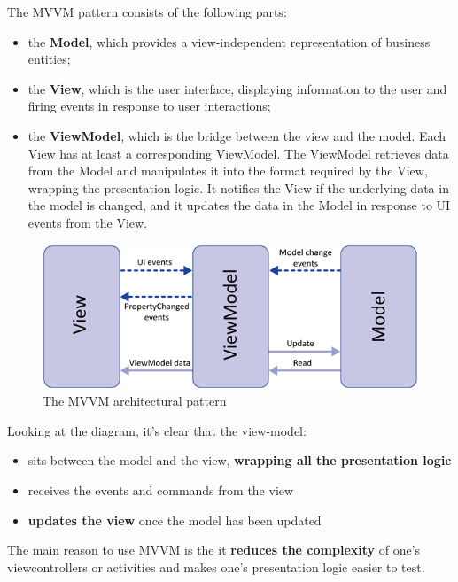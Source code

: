 The MVVM pattern consists of the following parts:

\begin{itemize}
\itemsep1pt\parskip0pt
\item
  the \textbf{Model}, which provides a view-independent representation
  of business entities;
\item
  the \textbf{View}, which is the user interface, displaying information
  to the user and firing events in response to user interactions;
\item
  the \textbf{ViewModel}, which is the bridge between the view and the
  model. Each View has at least a corresponding ViewModel. The ViewModel
  retrieves data from the Model and manipulates it into the format
  required by the View, wrapping the presentation logic. It notifies the
  View if the underlying data in the model is changed, and it updates
  the data in the Model in response to UI events from the View.
\end{itemize}

\begin{figure}[htbp]
\centering
\includegraphics[scale=0.75]{imgs/mvvm.png}
\caption{The MVVM architectural pattern}
\end{figure}

Looking at the diagram, it's clear that the view-model:

\begin{itemize}
\itemsep1pt\parskip0pt
\item
  sits between the model and the view, \textbf{wrapping all the
  presentation logic}
\item
  receives the events and commands from the view
\item
  \textbf{updates the view} once the model has been updated
\end{itemize}

The main reason to use MVVM is the it \textbf{reduces the complexity} of
one's viewcontrollers or activities and makes one's presentation logic
easier to test.

